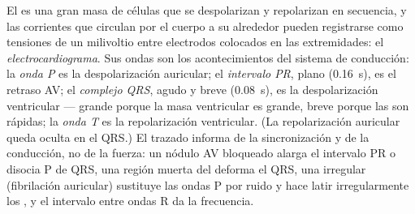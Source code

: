 \begin{proposition}[El electrocardiograma]\label{prop:b2:heart:ecg}
El  es una gran masa de células que se despolarizan y repolarizan
en secuencia, y las corrientes que circulan por el cuerpo a su alrededor
pueden registrarse como tensiones de un milivoltio entre electrodos
colocados en las extremidades: el \emph{electrocardiograma}. Sus ondas son
los acontecimientos del sistema de conducción: la \emph{onda P} es la
despolarización auricular; el \emph{intervalo PR}, plano (\qty{0.16}{s}),
es el retraso AV; el \emph{complejo QRS}, agudo y breve (\qty{0.08}{s}), es
la despolarización ventricular --- grande porque la masa ventricular es
grande, breve porque las  son rápidas; la \emph{onda T}
es la repolarización ventricular. (La repolarización auricular queda
oculta en el QRS.) El trazado informa de la sincronización y de la
conducción, no de la fuerza: un nódulo AV bloqueado alarga el intervalo PR
o disocia P de QRS, una región muerta del  deforma el QRS, una
 irregular (fibrilación auricular) sustituye las ondas P por ruido
y hace latir irregularmente los , y el intervalo entre ondas R
da la frecuencia.
\end{proposition}

